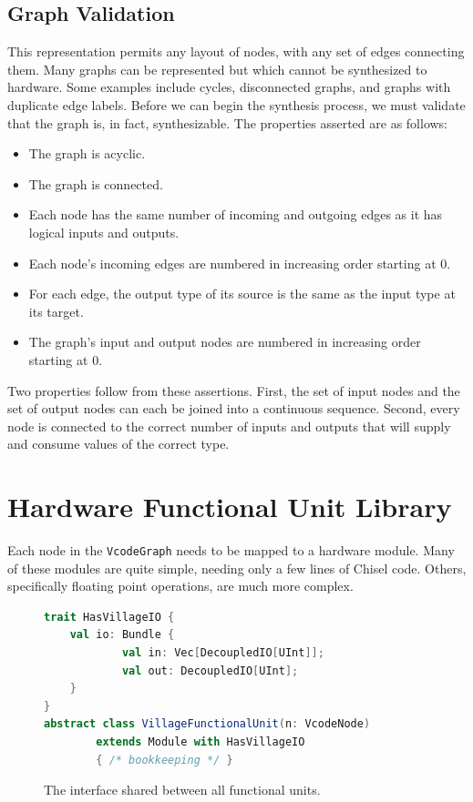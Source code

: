 \documentclass[sigconf, nonacm]{acmart}
\begin{document}
\subsection{Graph Validation}

This representation permits any layout of nodes, with any set of edges connecting them.
Many graphs can be represented but which cannot be synthesized to hardware.
Some examples include cycles, disconnected graphs, and graphs with duplicate edge labels.
Before we can begin the synthesis process, we must validate that the graph is, in fact, synthesizable.
The properties asserted are as follows:

\begin{itemize}
	\item The graph is acyclic.
	\item The graph is connected.
	\item Each node has the same number of incoming and outgoing edges as it has logical inputs and outputs.
	\item Each node's incoming edges are numbered in increasing order starting at 0.
	\item For each edge, the output type of its source is the same as the input type at its target.
	\item The graph's input and output nodes are numbered in increasing order starting at 0.
\end{itemize}

Two properties follow from these assertions.
First, the set of input nodes and the set of output nodes can each be joined into a continuous sequence.
Second, every node is connected to the correct number of inputs and outputs that will supply and consume values of the correct type.



\section{Hardware Functional Unit Library}

Each node in the \texttt{VcodeGraph} needs to be mapped to a hardware module.
Many of these modules are quite simple, needing only a few lines of Chisel code.
Others, specifically floating point operations, are much more complex.

\begin{figure}
	\begin{center}
		\begin{lstlisting}[language=scala]
trait HasVillageIO {
  	val io: Bundle {
  			val in: Vec[DecoupledIO[UInt]];
  			val out: DecoupledIO[UInt];
  	}
}
abstract class VillageFunctionalUnit(n: VcodeNode) 
		extends Module with HasVillageIO
		{ /* bookkeeping */ }
		\end{lstlisting}
	\end{center}
	\caption{The interface shared between all functional units.}
	\label{fig:fu-interface}
\end{figure}
\end{document}
